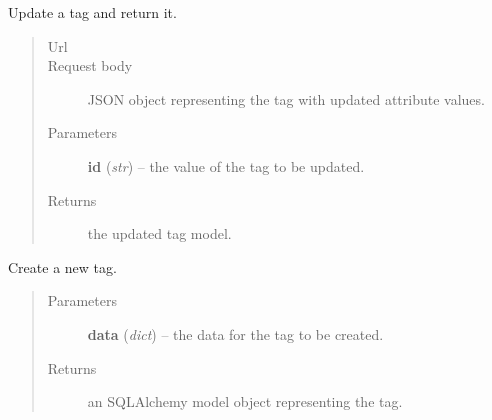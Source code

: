 \documentclass[letterpaper,10pt,english]{sphinxmanual}
\begin{document}
\begin{fulllineitems}
\begin{fulllineitems}
\end{fulllineitems}


\begin{fulllineitems}
\label{api:onlinelinguisticdatabase.controllers.tags.TagsController.update}
Update a tag and return it.
\begin{quote}\begin{description}
\item[{Url }] \leavevmode
{}

\item[{Request body}] \leavevmode
JSON object representing the tag with updated attribute values.

\item[{Parameters}] \leavevmode
\textbf{id} (\emph{str}) -- the  value of the tag to be updated.

\item[{Returns}] \leavevmode
the updated tag model.

\end{description}\end{quote}

\end{fulllineitems}


\end{fulllineitems}


\begin{fulllineitems}
\label{api:onlinelinguisticdatabase.controllers.tags.createNewTag}
Create a new tag.
\begin{quote}\begin{description}
\item[{Parameters}] \leavevmode
\textbf{data} (\emph{dict}) -- the data for the tag to be created.

\item[{Returns}] \leavevmode
an SQLAlchemy model object representing the tag.

\end{description}\end{quote}

\end{fulllineitems}
\end{document}
